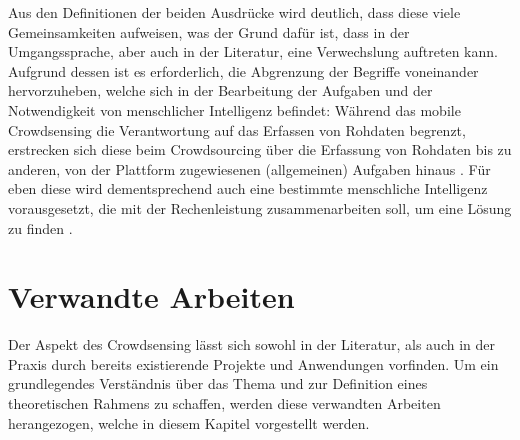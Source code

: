 Aus den Definitionen der beiden Ausdrücke wird deutlich, dass diese viele Gemeinsamkeiten aufweisen, was der Grund dafür ist, dass in der Umgangssprache, aber auch in der Literatur, eine Verwechslung auftreten kann. Aufgrund dessen ist es erforderlich, die Abgrenzung der Begriffe voneinander hervorzuheben, welche sich in der Bearbeitung der Aufgaben und der Notwendigkeit von menschlicher Intelligenz befindet: Während das mobile Crowdsensing die Verantwortung auf das Erfassen von Rohdaten begrenzt, erstrecken sich diese beim Crowdsourcing über die Erfassung von Rohdaten bis zu anderen, von der Plattform zugewiesenen (allgemeinen) Aufgaben hinaus \cite{Ray2022}. Für eben diese wird dementsprechend auch eine bestimmte menschliche Intelligenz vorausgesetzt, die mit der Rechenleistung zusammenarbeiten soll, um eine Lösung zu finden \cite{Ray2022}.

\section{Verwandte Arbeiten}
\label{sec:related_work}
Der Aspekt des Crowdsensing lässt sich sowohl in der Literatur, als auch in der Praxis durch bereits existierende Projekte und Anwendungen vorfinden. Um ein grundlegendes Verständnis über das Thema und zur Definition eines theoretischen Rahmens zu schaffen, werden diese verwandten Arbeiten herangezogen, welche in diesem Kapitel vorgestellt werden.

